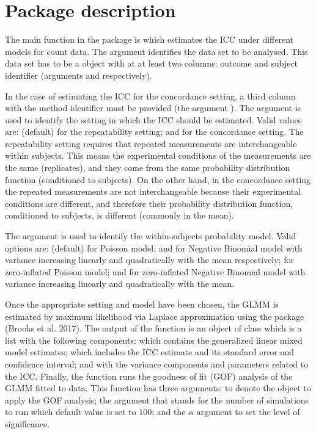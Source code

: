 \hypertarget{package-description}{%
\section{Package description}\label{package-description}}

The main function in the  package is  which estimates the ICC under different models for count data. The argument  identifies the data set to be analysed. This data set has to be a  object with at at least two columns: outcome and subject identifier (arguments  and  respectively).

In the case of estimating the ICC for the concordance setting, a third column with the method identifier must be provided (the argument ). The argument  is used to identify the setting in which the ICC should be estimated. Valid values are:  (default) for the repeatability setting; and  for the concordance setting. The repeatability setting requires that repeated measurements are interchangeable within subjects. This means the experimental conditions of the measurements are the same (replicates), and they come from the same probability distribution function (conditioned to subjects). On the other hand, in the concordance setting the repeated measurements are not interchangeable because their experimental conditions are different, and therefore their probability distribution function, conditioned to subjects, is different (commonly in the mean).

The argument  is used to identify the within-subjects probability model. Valid options are:  (default) for Poisson model;  and  for Negative Binomial model with variance increasing linearly and quadratically with the mean respectively;  for zero-inflated Poisson model;  and  for zero-inflated Negative Binomial model with variance increasing linearly and quadratically with the mean.

Once the appropriate setting and model have been chosen, the GLMM is estimated by maximum likelihood via Laplace approximation using the  package (Brooks et al. 2017). The output of the  function is an object of class  which is a list with the following components:  which contains the generalized linear mixed model estimates;  which includes the ICC estimate and its standard error and confidence interval; and  with the variance components and parameters related to the ICC. Finally, the function  runs the goodness of fit (GOF) analysis of the GLMM fitted to data. This function has three arguments:  to denote the  object to apply the GOF analysis; the  argument that stands for the number of simulations to run which default value is set to 100; and the \(\alpha\) argument to set the level of significance.

